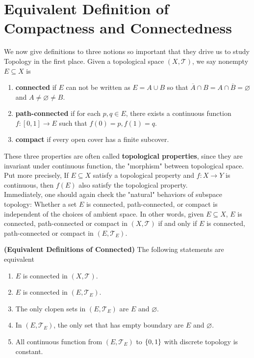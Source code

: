 \documentclass{report}
\begin{document}
\section{Equivalent Definition of Compactness and Connectedness}
\begin{abstract}

\end{abstract}
\begin{mdframed}
We now give definitions to three notions so important that they drive us to study Topology in the first place. Given a topological space $(X, \mathscr{T})$, we say nonempty $E \subseteq X$ is

\begin{enumerate}[label=(\alph*)]
    \item \textbf{connected} if $E$ can not be written as $E = A \cup B$ so that $\overline{A} \cap B = A \cap \overline{B} = \varnothing$ and $A \neq \varnothing \neq B$.
    \item \textbf{path-connected} if for each $p, q \in E$, there exists a continuous function $f : [0, 1] \to E$ such that $f(0) = p, f(1) = q$.
    \item \textbf{compact} if every open cover has a finite subcover.
\end{enumerate}
These three properties are often called \textbf{topological properties}, since they are invariant under continuous function, the "morphism" between topological space. Put more precisely, If $E \subseteq X$ satisfy a topological property and $f : X \to Y$ is continuous, then $f(E)$ also satisfy the topological property.\\

Immediately, one should again check the "natural" behaviors of subspace topology: Whether a set $E$ is connected, path-connected, or compact is independent of the choices of ambient space. In other words, given $E \subseteq X$, $E$ is connected, path-connected or compact in $(X, \mathscr{T})$ if and only if $E$ is connected, path-connected or compact in $(E, \mathscr{T}_E)$.
\end{mdframed}
\begin{theorem}
\label{Equivalent Definitions of Connected} 
\textbf{(Equivalent Definitions of Connected)} The following statements are equivalent
\begin{enumerate}[label=(\alph*)]
    \item $E$ is connected in $(X, \mathscr{T})$.
    \item $E$ is connected in $(E, \mathscr{T}_E)$.
    \item The only clopen sets in $(E, \mathscr{T}_E)$ are $E$ and $\varnothing$.
    \item In $(E, \mathscr{T}_E)$, the only set that has empty boundary are $E$ and $\varnothing$.
    \item All continuous function from $(E, \mathscr{T}_E)$ to $\{ 0, 1 \}$ with discrete topology is constant.
\end{enumerate}
\end{theorem}
\end{document}
